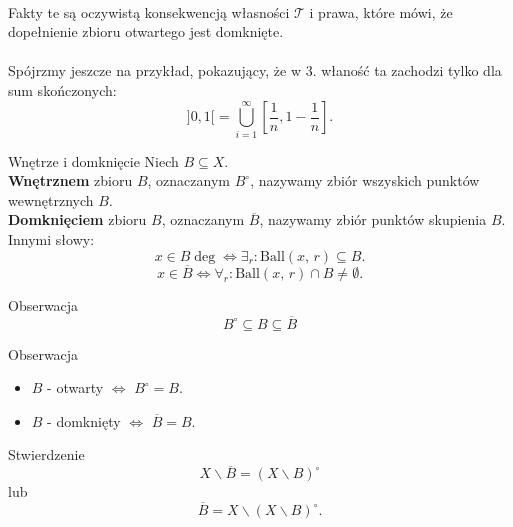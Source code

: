 \documentclass{article}
\newcommand{\oo}{\infty}
\newcommand{\Tau}{\mathcal{T}}
\newcommand{\dg}{^{\circ}}
\newcommand{\ball}[2]{\text{Ball}(#1, \, #2)}
\begin{document}
    \paragraph{} Fakty te są oczywistą konsekwencją własności $\Tau$ i prawa, które mówi, że dopełnienie zbioru otwartego jest domknięte. 
    \paragraph{} Spójrzmy jeszcze na przykład, pokazujący, że w 3. właność ta zachodzi tylko dla sum skończonych: \begin{equation*}
        ]0, 1[ = \bigcup_{i=1}^{\oo} [\frac{1}{n}, 1-\frac{1}{n}]. 
    \end{equation*}

    \begin{defr}{Wnętrze i domknięcie}
        Niech $B \subseteq X$.\\
        \textbf{Wnętrznem} zbioru $B$, oznaczanym $B \dg$, nazywamy zbiór wszyskich punktów wewnętrznych $B$.\\
        \textbf{Domknięciem} zbioru $B$, oznaczanym $\overline{B}$, nazywamy zbiór punktów skupienia $B$. \\
        Innymi słowy: \begin{equation}
            x \in B \deg \iff \exists_r: \ball{x}{r} \subseteq B.
        \end{equation} \begin{equation}
            x \in \overline{B} \iff \forall_r: \ball{x}{r} \cap B \neq \emptyset.
        \end{equation}
    \end{defr}

    \begin{obs}{Obserwacja}
        \begin{equation}
            B \dg \subseteq B \subseteq \overline{B}
        \end{equation}
    \end{obs}

    \begin{obs}{Obserwacja}
        \begin{itemize}
            \item $B$ - otwarty $\iff$ $B \dg = B.$ 
            \item $B$ - domknięty $\iff$ $\overline{B} = B.$ 
        \end{itemize}
    \end{obs}

    \begin{twier}{Stwierdzenie}
        \begin{equation}
            X \backslash \overline{B} = (X \backslash B) \dg
        \end{equation} lub \begin{equation}
            \overline{B} = X \backslash (X \backslash B) \dg.
        \end{equation}
    \end{twier}
\end{document}
